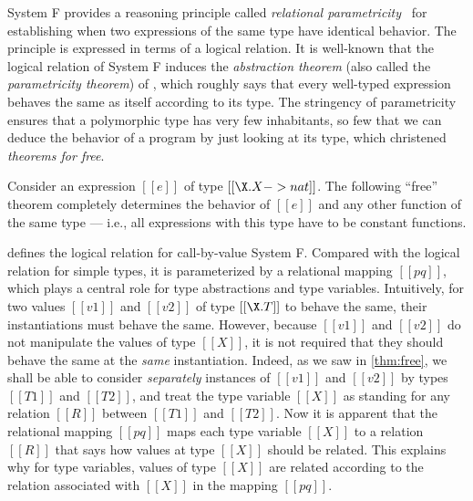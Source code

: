 System F provides a reasoning principle called \textit{relational
  parametricity}~\citep{reynolds1983types} for establishing when two expressions
of the same type have identical behavior. The principle is expressed in terms of
a logical relation. It is well-known that the logical relation of System F
induces the \textit{abstraction theorem} (also called the \textit{parametricity
  theorem}) of \citet{reynolds1983types}, which roughly says that every
well-typed expression behaves the same as itself according to its type. The
stringency of parametricity ensures that a polymorphic type has very few
inhabitants, so few that we can deduce the behavior of a program by just looking
at its type, which \citet{wadler1989theorems} christened \textit{theorems for free}.

Consider an expression $[[e]]$ of type $[[ \X . X -> nat ]]$. The following
``free'' theorem completely determines the behavior of $[[e]]$ and any other
function of the same type --- i.e., all expressions with this type have to be constant
functions.



 defines the logical relation for call-by-value System F.
Compared with the logical relation for simple types, it is parameterized by a
relational mapping $[[pq]]$, which plays a central role for type abstractions
and type variables. Intuitively, for two values $[[v1]]$ and $[[v2]]$ of type
$[[\X . T]]$ to behave the same, their instantiations must behave the same.
However, because $[[v1]]$ and $[[v2]]$ do not manipulate the values of type
$[[X]]$, it is not required that they should behave the same at the
\textit{same} instantiation. Indeed, as we saw in \cref{thm:free}, we shall be
able to consider \textit{separately} instances of $[[v1]]$ and $[[v2]]$ by types
$[[T1]]$ and $[[T2]]$, and treat the type variable $[[X]]$ as standing for any
relation $[[R]]$ between $[[T1]]$ and $[[T2]]$. Now it is apparent that the
relational mapping $[[pq]]$ maps each type variable $[[X]]$ to a relation
$[[R]]$ that says how values at type $[[X]]$ should be related. This explains
why for type variables, values of type $[[X]]$ are related according to the
relation associated with $[[X]]$ in the mapping $[[pq]]$.



